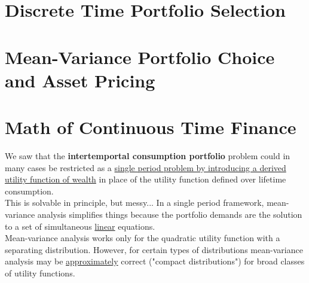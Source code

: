 \documentclass[
14pt,notheorems,hyperref={pdfauthor=whatever}
]{beamer}
\begin{document}
\section{Discrete Time Portfolio Selection}




\section{Mean-Variance Portfolio Choice and Asset Pricing}


\section{Math of Continuous Time Finance}

\begin{frame}
We saw that the \textbf{intertemportal consumption portfolio} problem could in many cases be restricted as a \underline{single period problem by introducing a derived utility function of wealth} in place of the utility function defined over lifetime consumption.\\
\hfill\break
This is solvable in principle, but messy... In a single period framework, mean-variance analysis simplifies things because the portfolio demands are the solution to a set of simultaneous \underline{linear} equations.\\
\hfill\break
Mean-variance analysis works only for the quadratic utility function with a separating distribution. However, for certain types of distributions mean-variance analysis may be \underline{approximately} correct ("compact distributions") for broad classes of utility functions.
\end{frame}
\end{document}
